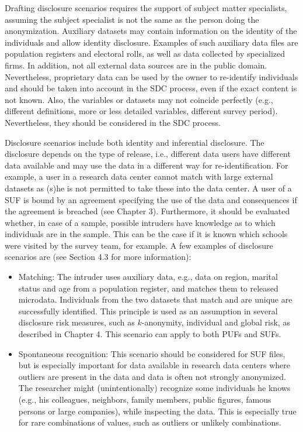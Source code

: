 \documentclass[letterpaper,10pt,english]{sphinxmanual}
\begin{document}
Drafting disclosure scenarios requires the support of subject matter
specialists, assuming the subject specialist is not the same as the
person doing the anonymization. Auxiliary datasets may contain
information on the identity of the individuals and allow identity
disclosure. Examples of such auxiliary data files are population
registers and electoral rolls, as well as data collected by specialized
firms.  In addition, not all external data
sources are in the public domain. Nevertheless, proprietary data can be
used by the owner to re-identify individuals and should be taken into
account in the SDC process, even if the exact content is not known.
Also, the variables or datasets may not coincide perfectly (e.g.,
different definitions, more or less detailed variables, different survey
period). Nevertheless, they should be considered in the SDC process.

Disclosure scenarios include both identity and inferential disclosure.
The disclosure depends on the type of release, i.e., different data
users have different data available and may use the data in a different
way for re-identification. For example, a user in a research data center
cannot match with large external datasets as (s)he is not permitted to
take these into the data center. A user of a SUF is bound by an
agreement specifying the use of the data and consequences if the
agreement is breached (see Chapter 3). Furthermore, it should be
evaluated whether, in case of a sample, possible intruders have
knowledge as to which individuals are in the sample. This can be the
case if it is known which schools were visited by the survey team, for
example. A few examples of disclosure scenarios are (see Section 4.3 for
more information):
\begin{itemize}
\item {} 
Matching: The intruder uses auxiliary data, e.g., data on region,
marital status and age from a population register, and matches them
to released microdata. Individuals from the two datasets that match
and are unique are successfully identified. This principle is used as
an assumption in several disclosure risk measures, such as
\(k\)-anonymity, individual and global risk, as described in
Chapter 4. This scenario can apply to both PUFs and SUFs.

\item {} 
Spontaneous recognition: This scenario should be considered for SUF
files, but is especially important for data available in research
data centers where outliers are present in the data and data is often
not strongly anonymized. The researcher might (unintentionally)
recognize some individuals he knows (e.g., his colleagues, neighbors,
family members, public figures, famous persons or large companies),
while inspecting the data. This is especially true for rare
combinations of values, such as outliers or unlikely combinations.

\end{itemize}
\end{document}
